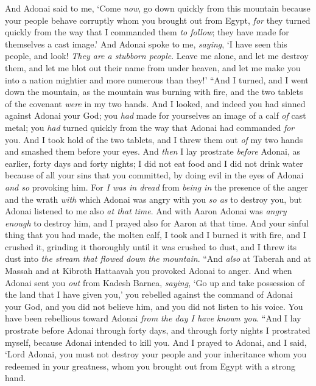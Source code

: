 \begin{biblechapter}
\verse And Adonai said to me, ‘Come \textit{now}, go down quickly from this mountain because your people behave corruptly whom you brought out from Egypt, \textit{for} they turned quickly from the way that I commanded them \textit{to follow}; they have made for themselves a cast image.’
\verse And Adonai spoke to me, \textit{saying}, ‘I have seen this people, and look! \textit{They are a stubborn people}.
\verse Leave me alone, and let me destroy them, and let me blot out their name from under heaven, and let me make you into a nation mightier and more numerous than they!’
\verse “And I turned, and I went down the mountain, as the mountain was burning with fire, and the two tablets of the covenant \textit{were} in my two hands.
\verse And I looked, and indeed you had sinned against Adonai your God; you \textit{had} made for yourselves an image of a calf \textit{of} cast metal;  you \textit{had} turned quickly from the way that Adonai had commanded \textit{for} you.
\verse And I took hold of the two tablets, and I threw them out \textit{of} my two hands and smashed them before your eyes.
\verse And \textit{then} I lay prostrate \textit{before} Adonai, as earlier, forty days and forty nights; I did not eat food and I did not drink water because of all your sins that you committed, by doing evil in the eyes of Adonai \textit{and so} provoking him.
\verse For \textit{I was in dread} from \textit{being in} the presence of the anger and the wrath \textit{with} which Adonai was angry with you \textit{so as} to destroy you, but Adonai listened to me also \textit{at that time}.
\verse And with Aaron Adonai was \textit{angry enough} to destroy him, and I prayed also for Aaron at that time.
\verse And your sinful thing that you had made, the molten calf, I took and I burned it with fire, and I crushed it, grinding it thoroughly until it was crushed to dust, and I threw its dust into \textit{the stream that flowed down the mountain}.
\verse “And \textit{also} at Taberah and at Massah and at Kibroth Hattaavah you provoked Adonai to anger.
\verse And when Adonai sent you \textit{out} from Kadesh Barnea, \textit{saying}, ‘Go up and take possession of the land that I have given you,’ you rebelled against the command of Adonai your God, and you did not believe him, and you did not listen to his voice.
\verse You have been rebellious toward Adonai \textit{from the day I have known you}.
\verse “And I lay prostrate before Adonai through forty days, and through forty nights I prostrated myself, because Adonai intended to kill you.
\verse And I prayed to Adonai, and I said, ‘Lord Adonai, you must not destroy your people and your inheritance whom you redeemed in your greatness, whom you brought out from Egypt with a strong hand.

\end{biblechapter}
